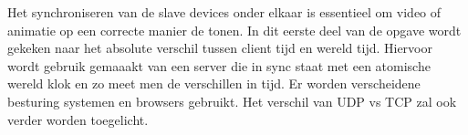 Het synchroniseren van de slave devices onder elkaar is essentieel om video of animatie op een correcte manier de tonen. In dit eerste deel van de opgave wordt gekeken naar het absolute verschil tussen client tijd en wereld tijd. Hiervoor wordt gebruik gemaaakt van een server die in sync staat met een atomische wereld klok en zo meet men de verschillen in tijd. Er worden verscheidene besturing systemen en browsers gebruikt. Het verschil van UDP vs TCP zal ook verder worden toegelicht. 